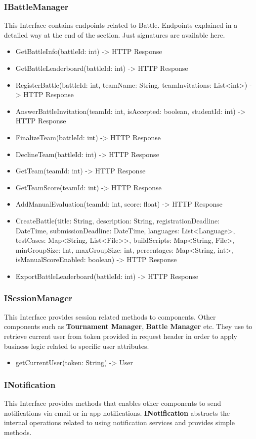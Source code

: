 \subsubsection{IBattleManager}
This Interface contains endpoints related to Battle. Endpoints explained in a detailed way at the end of the section. Just signatures are available here.
\begin{itemize}
\item GetBattleInfo(battleId: int) -> HTTP Response
\item GetBattleLeaderboard(battleId: int) -> HTTP Response
\item RegisterBattle(battleId: int, teamName: String, teamInvitations: List<int>) -> HTTP Response 
\item AnswerBattleInvitation(teamId: int, isAccepted: boolean, studentId: int) -> HTTP Response
\item FinalizeTeam(battleId: int) -> HTTP Response
\item DeclineTeam(battleId: int) -> HTTP Response
\item GetTeam(teamId: int) -> HTTP Response
\item GetTeamScore(teamId: int) -> HTTP Response
\item AddManualEvaluation(teamId: int, score: float) -> HTTP Response
\item CreateBattle(title: String, description: String, registrationDeadline: DateTime, submissionDeadline: DateTime, languages: List<Language>, testCases: Map<String, List<File>>, buildScripts: Map<String, File>, minGroupSize: Int, maxGroupSize: int, percentages: Map<String, int>, isManualScoreEnabled: boolean) -> HTTP Response 
\item ExportBattleLeaderboard(battleId: int) -> HTTP Response
\end{itemize}

\subsubsection{ISessionManager}
This Interface provides session related methods to components. Other components such as \textbf{Tournament Manager}, \textbf{Battle Manager} etc. They use to retrieve current user from token provided in request header in order to apply business logic related to specific user attributes.
\begin{itemize}
    \item getCurrentUser(token: String) -> User
\end{itemize}
\subsubsection{INotification}
This Interface provides methods that enables other components to send notifications via email or in-app notifications. \textbf{INotification} abstracts the internal operations related to using notification services and provides simple methods.

